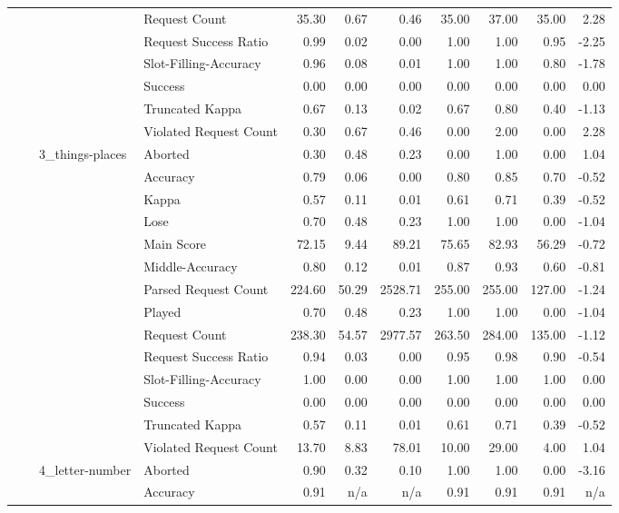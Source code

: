 \begin{tabular}{llllrrrrrrr}
 &  &  & Request Count & 35.30 & 0.67 & 0.46 & 35.00 & 37.00 & 35.00 & 2.28 \\
 &  &  & Request Success Ratio & 0.99 & 0.02 & 0.00 & 1.00 & 1.00 & 0.95 & -2.25 \\
 &  &  & Slot-Filling-Accuracy & 0.96 & 0.08 & 0.01 & 1.00 & 1.00 & 0.80 & -1.78 \\
 &  &  & Success & 0.00 & 0.00 & 0.00 & 0.00 & 0.00 & 0.00 & 0.00 \\
 &  &  & Truncated Kappa & 0.67 & 0.13 & 0.02 & 0.67 & 0.80 & 0.40 & -1.13 \\
 &  &  & Violated Request Count & 0.30 & 0.67 & 0.46 & 0.00 & 2.00 & 0.00 & 2.28 \\
\cline{3-11}
 &  & \multirow[t]{14}{*}{3_things-places} & Aborted & 0.30 & 0.48 & 0.23 & 0.00 & 1.00 & 0.00 & 1.04 \\
 &  &  & Accuracy & 0.79 & 0.06 & 0.00 & 0.80 & 0.85 & 0.70 & -0.52 \\
 &  &  & Kappa & 0.57 & 0.11 & 0.01 & 0.61 & 0.71 & 0.39 & -0.52 \\
 &  &  & Lose & 0.70 & 0.48 & 0.23 & 1.00 & 1.00 & 0.00 & -1.04 \\
 &  &  & Main Score & 72.15 & 9.44 & 89.21 & 75.65 & 82.93 & 56.29 & -0.72 \\
 &  &  & Middle-Accuracy & 0.80 & 0.12 & 0.01 & 0.87 & 0.93 & 0.60 & -0.81 \\
 &  &  & Parsed Request Count & 224.60 & 50.29 & 2528.71 & 255.00 & 255.00 & 127.00 & -1.24 \\
 &  &  & Played & 0.70 & 0.48 & 0.23 & 1.00 & 1.00 & 0.00 & -1.04 \\
 &  &  & Request Count & 238.30 & 54.57 & 2977.57 & 263.50 & 284.00 & 135.00 & -1.12 \\
 &  &  & Request Success Ratio & 0.94 & 0.03 & 0.00 & 0.95 & 0.98 & 0.90 & -0.54 \\
 &  &  & Slot-Filling-Accuracy & 1.00 & 0.00 & 0.00 & 1.00 & 1.00 & 1.00 & 0.00 \\
 &  &  & Success & 0.00 & 0.00 & 0.00 & 0.00 & 0.00 & 0.00 & 0.00 \\
 &  &  & Truncated Kappa & 0.57 & 0.11 & 0.01 & 0.61 & 0.71 & 0.39 & -0.52 \\
 &  &  & Violated Request Count & 13.70 & 8.83 & 78.01 & 10.00 & 29.00 & 4.00 & 1.04 \\
\cline{3-11}
 &  & \multirow[t]{14}{*}{4_letter-number} & Aborted & 0.90 & 0.32 & 0.10 & 1.00 & 1.00 & 0.00 & -3.16 \\
 &  &  & Accuracy & 0.91 & n/a & n/a & 0.91 & 0.91 & 0.91 & n/a \\

\end{tabular}
